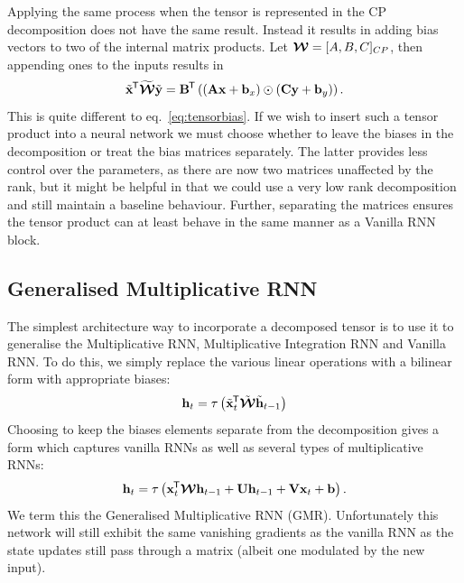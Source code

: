 Applying the same process when the tensor is represented in the CP decomposition does not
have the same result. Instead it results in adding bias vectors to two of the internal
matrix products. Let \(\bm{\mathcal{W}} = [A, B, C]_{CP}\), then appending ones to the inputs
results in
\begin{equation}
	\tilde{\mathbf{x}}^{\mkern-1.5mu\mathsf{T}}\widetilde{\bm{\mathcal{W}}}\tilde{\mathbf{y}}
	= \mathbf{B}^{\mkern-1.5mu\mathsf{T}}\left( (\mathbf{A}\mathbf{x} + \mathbf{b}_x) \odot (\mathbf{C}\mathbf{y} + \mathbf{b}_y)\right).
\end{equation} This is quite different to eq.~\eqref{eq:tensorbias}. If we wish to
insert such a tensor product into a neural network we must choose whether to leave the biases in
the decomposition or treat the bias matrices separately. The latter provides less control over the
parameters, as there are now two matrices unaffected by the rank, but it might be helpful in that we
could use a very low rank decomposition and still maintain a baseline behaviour. Further, separating
the matrices ensures the tensor product can at least behave in the same manner as a Vanilla RNN block.

\subsection{Generalised Multiplicative RNN}\label{sec:gmrnn}
The simplest architecture way to incorporate a decomposed tensor is to use it to generalise the
Multiplicative RNN, Multiplicative Integration RNN \autocite{Martens2011a, Wu2016} and Vanilla RNN.
To do this, we simply replace the various linear operations with a bilinear form with appropriate
biases:
\begin{equation}\label{eq:gmrnn}
	\mathbf{h}_t = \tau\left( \tilde{\mathbf{x}}_t^{\mkern-1.5mu\mathsf{T}}\tilde{\bm{\mathcal{W}}}\tilde{\mathbf{h}}_{t-1} \right)
\end{equation}
Choosing to keep the biases elements separate from the decomposition gives a form which captures
vanilla RNNs as well as several types of multiplicative RNNs:
\begin{equation}\label{eq:gmrnnbias}
	\mathbf{h}_t = \tau\left(\mathbf{x}_t^{\mkern-1.5mu\mathsf{T}}\bm{\mathcal{W}}\mathbf{h}_{t-1}
		+ \mathbf{U}\mathbf{h}_{t-1} + \mathbf{V}\mathbf{x}_t + \mathbf{b}\right).
\end{equation} We term this the Generalised Multiplicative RNN (GMR). Unfortunately this
network will still exhibit the same vanishing gradients as the vanilla RNN as the state updates
still pass through a matrix (albeit one modulated by the new input).

